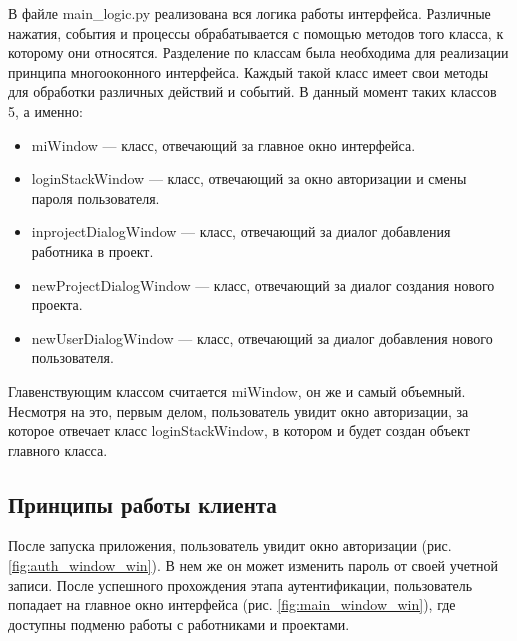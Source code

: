 



В файле main\_logic.py реализована вся логика работы интерфейса.
Различные нажатия, события и процессы обрабатывается с помощью методов того класса, к которому они относятся.
Разделение по классам была необходима для реализации принципа многооконного интерфейса.
Каждый такой класс имеет свои методы для обработки различных действий и событий. В данный момент таких классов 5, а именно:
\begin{itemize}
    \item miWindow --- класс, отвечающий за главное окно интерфейса.
    \item loginStackWindow --- класс, отвечающий за окно авторизации и смены пароля пользователя.
    \item inprojectDialogWindow --- класс, отвечающий за диалог добавления работника в проект.
    \item newProjectDialogWindow --- класс, отвечающий за диалог создания нового проекта.
    \item newUserDialogWindow --- класс, отвечающий за диалог добавления нового пользователя.
\end{itemize}

Главенствующим классом считается miWindow, он же и самый объемный. Несмотря на это, первым делом, пользователь увидит окно авторизации, 
за которое отвечает класс loginStackWindow, в котором и будет создан объект главного класса.


\clearpage
\subsection{Принципы работы клиента}
После запуска приложения, пользователь увидит окно авторизации (рис. \ref{fig:auth_window_win}). В нем же он может изменить пароль от своей учетной записи. После успешного прохождения этапа аутентификации, пользователь попадает на главное окно интерфейса (рис. \ref{fig:main_window_win}), где доступны подменю работы с работниками и проектами.

